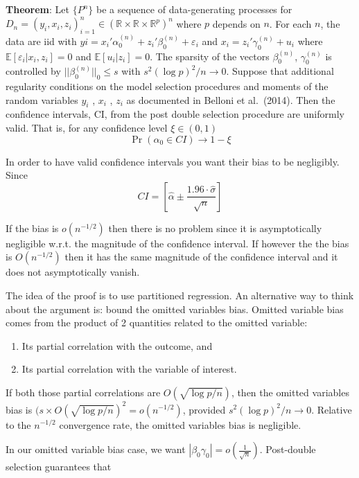 \documentclass[12pt,]{book}
\providecommand{\tightlist}{%
  \setlength{\itemsep}{0pt}\setlength{\parskip}{0pt}}
\begin{document}
\textbf{Theorem}:
Let \(\{P^n\}\) be a sequence of data-generating processes for \(D_n = (y_i, x_i, z_i)^n_{i=1} \in (\mathbb R \times \mathbb R \times \mathbb R^p) ^n\) where \(p\) depends on \(n\). For each \(n\), the data are iid with \(yi = x_i'\alpha_0^{(n)} + z_i' \beta_0^{(n)} + \varepsilon_i\) and \(x_i = z_i' \gamma_0^{(n)} + u_i\) where \(\mathbb E[\varepsilon_i | x_i,z_i] = 0\) and \(\mathbb E[u_i|z_i] = 0\). The sparsity of the vectors \(\beta_0^{(n)}\), \(\gamma_0^{(n)}\) is controlled by \(|| \beta_0^{(n)} ||_0 \leq s\) with \(s^2 (\log p)^2/n \to 0\). Suppose that additional regularity conditions on the model selection procedures and moments of the random variables \(y_i\) , \(x_i\) , \(z_i\) as documented in Belloni et al.~(2014). Then the confidence intervals, CI, from the post double selection procedure are uniformly valid. That is, for any confidence level \(\xi \in (0, 1)\)
\[
        \Pr(\alpha_0 \in CI) \to 1- \xi
\]

In order to have valid confidence intervals you want their bias to be negligibly. Since
\[
  CI = \left[ \hat{\alpha} \pm \frac{1.96 \cdot \hat{\sigma}}{\sqrt{n}} \right]
\]

If the bias is \(o(n^{-1/2})\) then there is no problem since it is asymptotically negligible w.r.t. the magnitude of the confidence interval. If however the the bias is \(O(n^{-1/2})\) then it has the same magnitude of the confidence interval and it does not asymptotically vanish.

The idea of the proof is to use partitioned regression. An alternative way to think about the argument is: bound the omitted variables bias. Omitted variable bias comes from the product of 2 quantities related to the omitted variable:

\begin{enumerate}
\def\labelenumi{\arabic{enumi}.}
\tightlist
\item
  Its partial correlation with the outcome, and
\item
  Its partial correlation with the variable of interest.
\end{enumerate}

If both those partial correlations are \(O( \sqrt{\log p/n})\), then the omitted variables bias is \((s \times O( \sqrt{\log p/n})^2 = o(n^{-1/2})\), provided \(s^2 (\log p)^2/n \to 0\). Relative to the \(n^{-1/2}\) convergence rate, the omitted variables bias is negligible.

In our omitted variable bias case, we want \(| \beta_0 \gamma_0 | = o \left(\frac{1}{\sqrt{n}}\right)\). Post-double selection guarantees that
\end{document}
